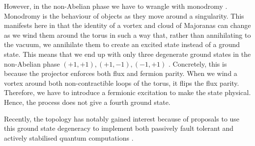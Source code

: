 However, in the non-Abelian phase we have to wrangle with monodromy \autocite{chungExplicitMonodromyMoore2007,oshikawaTopologicalDegeneracyNonAbelian2007}. Monodromy is the behaviour of objects as they move around a singularity. This manifests here in that the identity of a vortex and cloud of Majoranas can change as we wind them around the torus in such a way that, rather than annihilating to the vacuum, we annihilate them to create an excited state instead of a ground state. This means that we end up with only three degenerate ground states in the non-Abelian phase \((+1, +1), (+1, -1), (-1, +1)\) \autocite{chungTopologicalQuantumPhase2010,yaoAlgebraicSpinLiquid2009}. Concretely, this is because the projector enforces both flux and fermion parity. When we wind a vortex around both non-contractible loops of the torus, it flips the flux parity. Therefore, we have to introduce a fermionic excitation to make the state physical. Hence, the process does not give a fourth ground state.

Recently, the topology has notably gained interest because of proposals to use this ground state degeneracy to implement both passively fault tolerant and actively stabilised quantum computations \autocite{kitaevFaulttolerantQuantumComputation2003,poulinStabilizerFormalismOperator2005,hastingsDynamicallyGeneratedLogical2021}.
